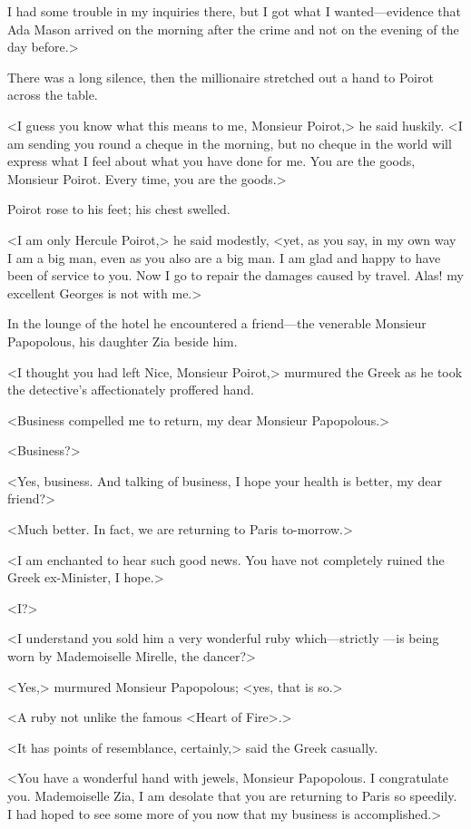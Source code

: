 I had some trouble in my inquiries there, but I got what I wanted—evidence that Ada Mason arrived on the morning after the crime and not on the evening of the day before.>

There was a long silence, then the millionaire stretched out a hand to Poirot across the table.

<I guess you know what this means to me, Monsieur Poirot,> he said huskily. <I am sending you round a cheque in the morning, but no cheque in the world will express what I feel about what you have done for me. You are the goods, Monsieur Poirot. Every time, you are the goods.>

Poirot rose to his feet; his chest swelled.

<I am only Hercule Poirot,> he said modestly, <yet, as you say, in my own way I am a big man, even as you also are a big man. I am glad and happy to have been of service to you. Now I go to repair the damages caused by travel. Alas! my excellent Georges is not with me.>

In the lounge of the hotel he encountered a friend—the venerable Monsieur Papopolous, his daughter Zia beside him.

<I thought you had left Nice, Monsieur Poirot,> murmured the Greek as he took the detective's affectionately proffered hand.

<Business compelled me to return, my dear Monsieur Papopolous.>

<Business?>

<Yes, business. And talking of business, I hope your health is better, my dear friend?>

<Much better. In fact, we are returning to Paris to-morrow.>

<I am enchanted to hear such good news. You have not completely ruined the Greek ex-Minister, I hope.>

<I?>

<I understand you sold him a very wonderful ruby which—strictly —is being worn by Mademoiselle Mirelle, the dancer?>

<Yes,> murmured Monsieur Papopolous; <yes, that is so.>

<A ruby not unlike the famous <Heart of Fire>.>

<It has points of resemblance, certainly,> said the Greek casually.

<You have a wonderful hand with jewels, Monsieur Papopolous. I congratulate you. Mademoiselle Zia, I am desolate that you are returning to Paris so speedily. I had hoped to see some more of you now that my business is accomplished.>

